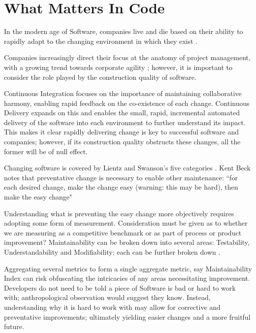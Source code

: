 \section{What Matters In Code}

In the modern age of Software, companies live and die based on their ability to rapidly adapt to the changing environment in which they exist \parencite[Chapter~1]{kersten_2018}.

Companies increasingly direct their focus at the anatomy of project management, with a growing trend towards corporate agility \parencite{stateOfAgile_2019}; however, it is important to consider the role played by the construction quality of software.

Continuous Integration \parencite{duvall2007continuous} focuses on the importance of maintaining collaborative harmony, enabling rapid feedback on the co-existence of each change. Continuous Delivery \parencite{humble_farley_2010} expands on this and enables the small, rapid, incremental automated delivery of the software into each environment to further understand its impact. This makes it clear rapidly delivering change is key to successful software and companies; however, if its construction quality obstructs these changes, all the former will be of null effect.

Changing software is covered by Lientz and Swanson's five categories \parencite*{lientz1980software}. Kent Beck notes that preventative change is necessary to enable other maintenance: ``for each desired change, make the change easy (warning: this may be hard), then make the easy change" \parencite{beck_2012_easychange}

Understanding what is preventing the easy change more objectively requires adopting some form of measurement. Consideration must be given as to whether we are measuring as a competitive benchmark or as part of process or product improvement? Maintainability can be broken down into several areas: Testability, Understandability and Modifiability; each can be further broken down \parencite{Boehm:1976:QES:800253.807736}.

Aggregating several metrics to form a single aggregate metric, say Maintainability Index \parencite{bray1997c4} can risk obfuscating the intricacies of any areas necessitating improvement. Developers do not need to be told a piece of Software is bad or hard to work with; anthropological observation would suggest they know. Instead, understanding why it is hard to work with may allow for corrective and preventative improvements; ultimately yielding easier changes and a more fruitful future.


